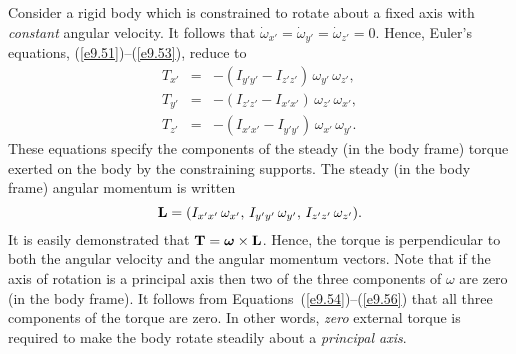  Consider a rigid body which is constrained to rotate about a fixed
 axis with {\em constant}\/ angular velocity. It follows that
 $\dot{\omega}_{x'}=\dot{\omega}_{y'} = \dot{\omega}_{z'}=0$.
 Hence, Euler's equations, (\ref{e9.51})--(\ref{e9.53}), reduce to
 \begin{eqnarray}\label{e9.54}
 T_{x'} &=&  - (I_{y'y'}-I_{z'z'})\,\omega_{y'}\,\omega_{z'},\\[0.5ex]
 T_{y'} &=&  - (I_{z'z'}-I_{x'x'})\,\omega_{z'}\,\omega_{x'},\\[0.5ex]
 T_{z'} &=&  - (I_{x'x'}-I_{y'y'})\,\omega_{x'}\,\omega_{y'}.\label{e9.56}
 \end{eqnarray}
 These equations specify the components of the steady (in the body frame) torque  exerted on the body by 
 the constraining supports. The steady (in the
 body frame) angular momentum is written
 \begin{equation}\label{e9.57x}
 {\bf L} = (I_{x'x'}\,\omega_{x'},\,I_{y'y'}\,\omega_{y'},\,
 I_{z'z'}\,\omega_{z'}).
 \end{equation}
 It is easily demonstrated that ${\bf T}= \mbox{\boldmath$\omega$}\times{\bf L}$. Hence,
 the torque is perpendicular to both the angular velocity and the angular
 momentum vectors.
 Note that if the axis of rotation is a principal
 axis then two of the three components of 
\mbox{\boldmath$\omega$} are zero (in the body frame). It follows from Equations~(\ref{e9.54})--(\ref{e9.56}) that
all three components of the torque are zero. In other words, {\em zero}\/ external torque
is required to make the body  rotate steadily about a {\em principal axis}.

